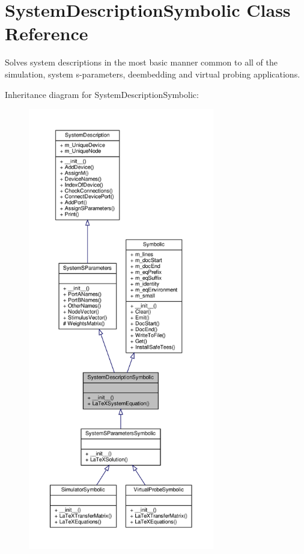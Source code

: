 \hypertarget{classSignalIntegrity_1_1SystemDescriptions_1_1SystemDescriptionSymbolic_1_1SystemDescriptionSymbolic}{}\section{System\+Description\+Symbolic Class Reference}
\label{classSignalIntegrity_1_1SystemDescriptions_1_1SystemDescriptionSymbolic_1_1SystemDescriptionSymbolic}


Solves system descriptions in the most basic manner common to all of the simulation, system s-\/parameters, deembedding and virtual probing applications.  




Inheritance diagram for System\+Description\+Symbolic\+:
\nopagebreak
\begin{figure}[H]
\begin{center}
\leavevmode
\includegraphics[height=550pt]{classSignalIntegrity_1_1SystemDescriptions_1_1SystemDescriptionSymbolic_1_1SystemDescriptionSymbolic__inherit__graph}
\end{center}
\end{figure}


